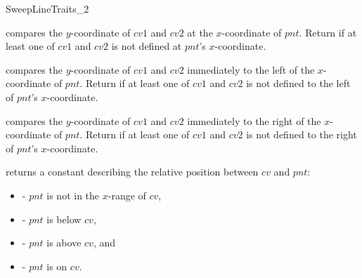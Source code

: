 \begin{ccRefConcept}{SweepLineTraits_2}
    
    {compares the $y$-coordinate of $cv1$ and $cv2$ at the $x$-coordinate 
     of $pnt$. Return  if at least one of $cv1$ and $cv2$  
     is not defined at $pnt$'s $x$-coordinate.}
   
  {compares the $y$-coordinate of $cv1$ and $cv2$ immediately to the
     left of the $x$-coordinate of $pnt$. Return 
     if at least one of $cv1$ and $cv2$ is not defined to the left of $pnt$'s
     $x$-coordinate.}
    
   {compares the $y$-coordinate of $cv1$ and
     $cv2$ immediately to the right of the $x$-coordinate of $pnt$.
     Return  if at least one of $cv1$ and $cv2$ is
     not defined to the right of $pnt$'s $x$-coordinate.}

    
     {returns a constant describing the
       relative position between $cv$ and $pnt$:
       \begin{itemize}
       \item[] - $pnt$ is not in the $x$-range of
       $cv$, 
       \item[] - $pnt$ is below $cv$,
       \item[] - $pnt$ is above $cv$, and
       \item[] - $pnt$ is on $cv$.
       \end{itemize}}






\end{ccRefConcept}
